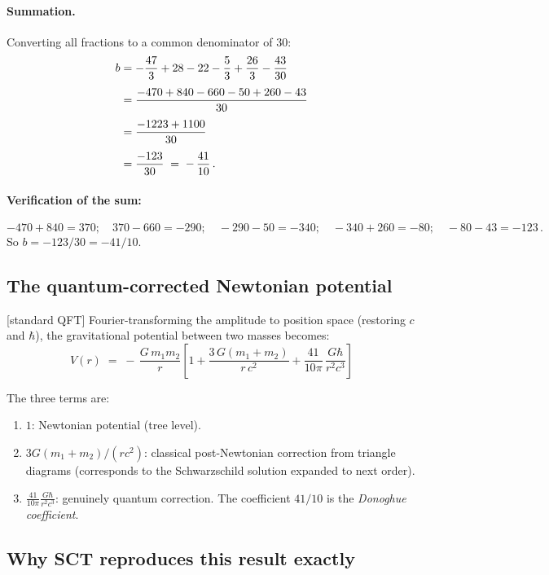 \documentclass[12pt,a4paper]{article}
\theoremstyle{definition}
\theoremstyle{remark}
\newcommand{\stdqft}{\textcolor{teal!80!black}{\textsf{[standard QFT]}}}
\begin{document}
\paragraph{Summation.}
Converting all fractions to a common denominator of 30:
\begin{align}
  b &= -\frac{47}{3} + 28 - 22 - \frac{5}{3}
       + \frac{26}{3} - \frac{43}{30}
  \notag\\[4pt]
  &= \frac{-470 + 840 - 660 - 50 + 260 - 43}{30}
  \notag\\[4pt]
  &= \frac{-1223 + 1100}{30}
  \notag\\[4pt]
  &= \frac{-123}{30}
  \;=\; -\,\frac{41}{10}\,.
  \label{eq:b-sum}
\end{align}

\paragraph{Verification of the sum:}
\[
  -470 + 840 = 370;\quad 370 - 660 = -290;\quad
  -290 - 50 = -340;\quad -340 + 260 = -80;\quad
  -80 - 43 = -123\,.
\]
So $b = -123/30 = -41/10$. \checkmark


\subsection{The quantum-corrected Newtonian potential}

\stdqft\;
Fourier-transforming the amplitude to position space (restoring
$c$ and $\hbar$), the gravitational potential between two masses
becomes:
\begin{equation}
  \boxed{
  V(r)
  \;=\;
  -\,\frac{G\,m_1 m_2}{r}
  \left[
    1
    + \frac{3\,G(m_1+m_2)}{r\,c^2}
    + \frac{41}{10\pi}\,\frac{G\hbar}{r^2 c^3}
  \right]
  }
  \label{eq:potential}
\end{equation}

The three terms are:
\begin{enumerate}[label=(\roman*)]
\item $1$: Newtonian potential (tree level).
\item $3G(m_1{+}m_2)/(rc^2)$: classical post-Newtonian correction
  from triangle diagrams (corresponds to the Schwarzschild solution
  expanded to next order).
\item $\frac{41}{10\pi}\frac{G\hbar}{r^2c^3}$: genuinely quantum
  correction.  The coefficient $41/10$ is the
  \emph{Donoghue coefficient}.
\end{enumerate}


\subsection{Why SCT reproduces this result exactly}
\end{document}
